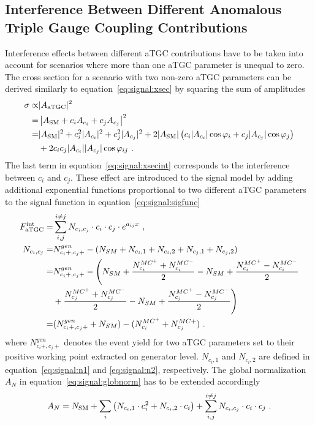 \subsection{Interference Between Different Anomalous Triple Gauge Coupling Contributions}
\label{subsec:signal:aTGCInt}
Interference effects between different aTGC contributions have to be taken into account for scenarios where more than one aTGC parameter is unequal to zero. The cross section for a scenario with two non-zero aTGC parameters can be derived similarly to equation~\ref{eq:signal:xsec} by squaring the sum of amplitudes
\begin{align}
\sigma \propto& |A_{\rm aTGC}|^2 \\
=& \left| A_{\rm SM} + c_i A_{c_i} + c_j A_{c_j} \right|^2 \\
=& |A_{\rm SM}|^2 + c_i^2 |A_{c_i}|^2 + c_j^2 |A_{c_j}|^2 + 2|A_{\rm SM}|\left( c_i|A_{c_i}|\cos \varphi_i + c_j|A_{c_j}|\cos \varphi_j\right) \nonumber \\
&+ 2c_ic_j|A_{c_i}||A_{c_j}|\cos \varphi_{ij} ~. \label{eq:signal:xsecint}
\end{align}
The last term in equation~\ref{eq:signal:xsecint} corresponds to the interference between $c_i$ and $c_j$. These effect are introduced to the signal model by adding additional exponential functions proportional to two different aTGC parameters to the signal function in equation~\ref{eq:signal:sigfunc}
\begin{align}
F_{\rm aTGC}^{\rm int} =& \sum_{i,j}^{i \neq j} N_{c_i,c_j} \cdot c_i \cdot c_j \cdot e^{a_{ij}x} ~, \\
N_{c_i,c_j} =& N_{c_i+,c_j+}^{gen} - (N_{SM} + N_{c_i,1} + N_{c_i,2} + N_{c_j,1} + N_{c_j,2}) \\ 
	=& N_{c_i+,c_j+}^{gen} - \Bigg(N_{SM} + \frac{N_{c_i}^{MC^+}+N_{c_i}^{MC^-}}{2}-N_{SM} + \frac{N_{c_i}^{MC^+}-N_{c_i}^{MC^-}}{2} \\ 
	&+ \frac{N_{c_j}^{MC^+}+N_{c_j}^{MC^-}}{2}-N_{SM} + \frac{N_{c_j}^{MC^+}-N_{c_j}^{MC^-}}{2} \Bigg) \nonumber \\ 
	=&(N_{c_i+,c_j+}^{gen}+N_{SM})-(N_{c_i}^{MC^+}+N_{c_j}^{MC+}) ~. 
\end{align}
where $N_{c_i+,c_j+}^{gen}$ denotes the event yield for two aTGC parameters set to their positive working point extracted on generator level. $N_{c_i,1}$ and $N_{c_i,2}$ are defined in equation~\ref{eq:signal:n1} and \ref{eq:signal:n2}, respectively. The global normalization $A_N$ in equation~\ref{eq:signal:globnorm} has to be extended accordingly
\begin{equation}
A_N = N_{\rm SM} + \sum_i \left( N_{c_i,1}\cdot c_i^2 + N_{c_i,2}\cdot c_i \right) + \sum_{i,j}^{i \neq j} N_{c_i,c_j} \cdot c_i \cdot c_j ~. 
\end{equation}

